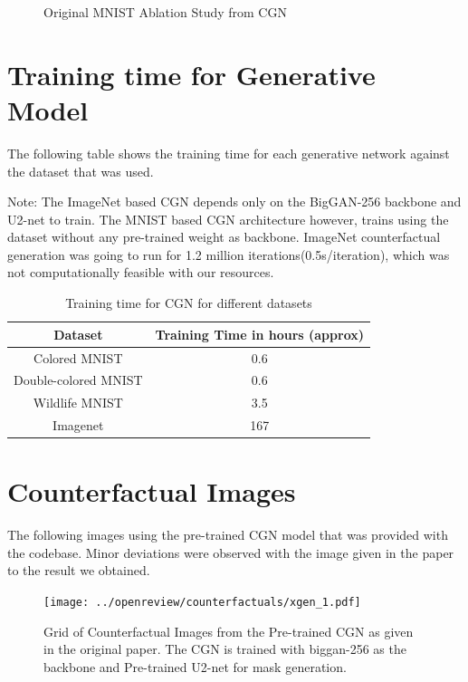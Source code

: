 \begin{figure}[h!]
\begin{subfigure}{0.3\linewidth}
     \end{subfigure}
        \caption{Original MNIST Ablation Study from CGN\cite{sauer2021counterfactual}}
    \label{fig:mnist-ablation-theirs}
\end{figure}



\section{Training time for Generative Model}

The following table shows the training time for each generative network against the dataset that was used.

Note: The ImageNet based CGN depends only on the BigGAN-256 backbone and U2-net to train. The MNIST based CGN architecture however, trains using the dataset without any pre-trained weight as backbone.
ImageNet counterfactual generation was going to run for 1.2 million iterations(0.5s/iteration), which was not computationally feasible with our resources.

\begin{table}[H]
    \centering
    \footnotesize
    \captionsetup{font=footnotesize,skip=1mm}
    \caption{Training time for CGN for different datasets}
    \label{table:training_time_cgn}
    \begin{tabular}{@{}cc@{}}
    \toprule
    \textbf{Dataset} & \textbf{Training Time in hours (approx)} \\ \midrule
    Colored MNIST & 0.6 \\
    Double-colored MNIST & 0.6 \\
    Wildlife MNIST & 3.5\\
    Imagenet & 167 \\
    \bottomrule
    \end{tabular}
\end{table}


\section{Counterfactual Images}
The following images using the pre-trained CGN model that was provided with the codebase. Minor deviations were observed with the image given in the paper to the result we obtained. 
\begin{figure}[ht!]
\centering
    \texttt{[image: ../openreview/counterfactuals/xgen\_1.pdf]}
    \caption{Grid of Counterfactual Images from the Pre-trained CGN \cite{sauer2021counterfactual} as given in the original paper. The CGN is trained with biggan-256 as the backbone and Pre-trained U2-net for mask generation.  
    }
    \label{fig:original_counterfactuals}
\end{figure}

